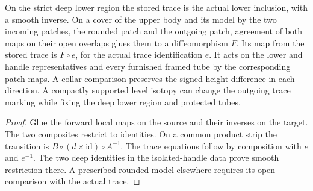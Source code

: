 \begin{theorem}
\label{thm:ed03-marked-glue}
\leanok
On the strict deep lower region the stored trace is the actual lower
inclusion, with a smooth inverse. On a cover of the upper body and its
model by the two incoming patches, the rounded patch and the outgoing
patch, agreement of both maps on their open overlaps glues them to a
diffeomorphism $F$. Its map from the stored trace is $F\circ e$, for the
actual trace identification $e$. It acts on the lower and handle
representatives and every furnished framed tube by the corresponding patch
maps. A collar comparison preserves the signed height difference in each
direction. A compactly supported level isotopy can change the outgoing
trace marking while fixing the deep lower region and protected tubes.
\end{theorem}
\begin{proof}
\leanok
Glue the forward local maps on the source and their inverses on the target.
The two composites restrict to identities. On a common product strip the
transition is $B\circ(d\times\mathrm{id})\circ A^{-1}$. The trace
equations follow by composition with $e$ and $e^{-1}$. The two deep
identities in the isolated-handle data prove smooth restriction there.
A prescribed rounded model elsewhere requires its open comparison with
the actual trace.
\end{proof}

